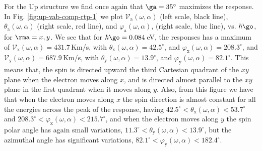\documentclass[floatfix,prb,aps,superscriptaddress,showpacs,11pt,preprint,letterpaper]{revtex4}
\begin{document}
For the Up structure we find once again that  $\ga=35^{\circ}$ maximizes the
response. In Fig. \ref{fig:up-vab-comp-rtp-1} we plot $\mathcal{V}_{\mathrm{a}}
(\omega,\alpha)$ (left scale, black line), $\theta_{\mathrm{a}}
(\omega,\alpha)$ (right scale, red line), and $\varphi_{\mathrm{a}}
(\omega,\alpha)$, (right scale, blue line), vs. $\hbar\go$, for $\rma=x,y$. 
% 
We see that for $\hbar\go=0.084$\,eV, the responses has a maximum of
$\mathcal{V}_{\mathrm{x}} (\omega,\alpha)=431.7$\,Km/s, with
$\theta_{\mathrm{x}}(\omega,\alpha) = 42.5^{\circ}$, and
$\varphi_{\mathrm{x}}(\omega,\alpha) = 208.3^{\circ}$, and
$\mathcal{V}_{\mathrm{y}} (\omega,\alpha)=687.9$\,Km/s, with
$\theta_{\mathrm{y}}(\omega,\alpha) = 13.9^{\circ}$, and
$\varphi_{\mathrm{y}} (\omega,\alpha) = 82.1^{\circ}$. This means that, the
spin is directed upward the third Cartesian quadrant of the $xy$ plane when the
electron moves along $x$, and is directed almost parallel to the $xy$ plane in
the first quadrant when it moves along $y$. 
% 
Also, from this figure we have that when the electron moves along $x$ the spin
direction is almost constant for all the energies across the peak of the
response, having
$42.5^{\circ}<\theta_{\mathrm{x}}(\omega,\alpha)<53.7^{\circ}$ and
$208.3^{\circ}<\varphi_{\mathrm{x}}(\omega,\alpha)<215.7^{\circ}$, and when
the electron moves along $y$ the spin polar angle has again small variations,
$11.3^{\circ}< \theta_{\mathrm{y}}(\omega,\alpha)<13.9^{\circ}$, but the
azimuthal angle has significant variations, $82.1^{\circ}<
\varphi_{\mathrm{y}}(\omega,\alpha)<182.4^{\circ}$.
\end{document}
